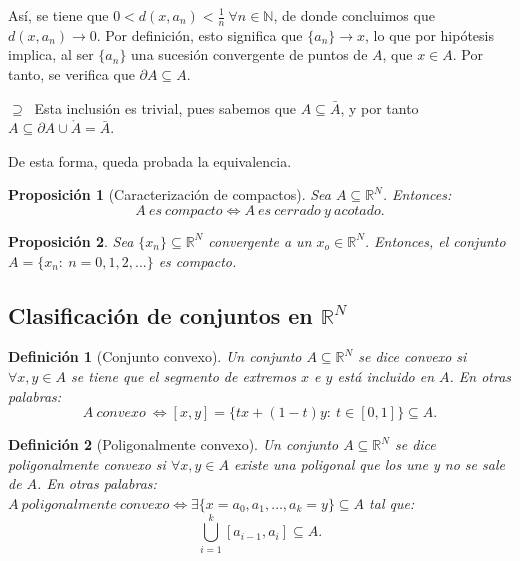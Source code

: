 \documentclass[11pt, a4paper, titlepage]{article}
\makeatletter
\renewenvironment{proof}[1][\proofname] {\vspace{-15pt}\par\pushQED{\qed}\normalfont\topsep6\p@\@plus6\p@\relax\trivlist\item[\hskip\labelsep\it#1\@addpunct{.}]\ignorespaces}{\popQED\endtrivlist\@endpefalse}
\theoremstyle{theorem-style}
\newtheorem*{nprop}{Proposición}
\theoremstyle{definition-style}
\newtheorem*{ndef}{Definición}
\theoremstyle{remark-style}
\theoremstyle{example-style}
\makeatother
\begin{document}
\begin{proof}
\begin{description}
Así, se tiene que $0 < d(x,a_n) < \frac{1}{n}\ \forall n\in \mathbb{N}$, de donde concluimos que $d(x,a_n) \rightarrow 0$. Por definición, esto significa que $\{a_n\} \rightarrow x$, lo que por hipótesis implica, al ser $\{a_n\}$ una sucesión convergente de puntos de $A$, que  $x\in A$. Por tanto, se verifica que $\partial A \subseteq A$.

\item $\displaystyle \boxed{\supseteq}\ $ Esta inclusión es trivial, pues sabemos que $A \subseteq \bar{A}$, y por tanto $A \subseteq \partial A \cup \mathring{A} = \bar{A}$.
\end{description}

De esta forma, queda probada la equivalencia.
\end{proof}



\begin{nprop}[Caracterización de compactos]
Sea $A \subseteq \mathbb{R}^N$. Entonces: $$A\ es\ compacto \iff A\ es\ cerrado\ y\ acotado.$$
\end{nprop}



\begin{nprop}
Sea $\{x_n\} \subseteq \mathbb{R}^N$ convergente a un $x_o \in \mathbb{R}^N$. Entonces, el conjunto \hfill \\$A = \{x_n:\ n=0,1,2,\dots \}$ es compacto.
\end{nprop}



\subsection{Clasificación de conjuntos en $\mathbb{R}^N$}

\begin{ndef}[Conjunto convexo]
Un conjunto $A\subseteq \mathbb{R}^N$ se dice \textit{convexo} si $\forall x,y \in A$ se tiene que el segmento de extremos $x$ e $y$ está incluido en $A$. En otras palabras: $$A\ convexo\ \iff [x,y] = \{tx + (1-t)y: \ t\in [0,1]\} \subseteq A.$$
\end{ndef}



\begin{ndef}[Poligonalmente convexo]
Un conjunto $A\subseteq \mathbb{R}^N$ se dice \textit{poligonalmente convexo} si  $\forall x,y \in A$ existe una poligonal que los une y no se sale de $A$. En otras palabras:  $A\ poligonalmente\ convexo \iff \exists \{x= a_0, a_1,\dots,a_k=y \}\subseteq A$ tal que: $$\bigcup_{i=1}^k [a_{i-1},a_i] \subseteq A.$$
\end{ndef}
\end{document}
